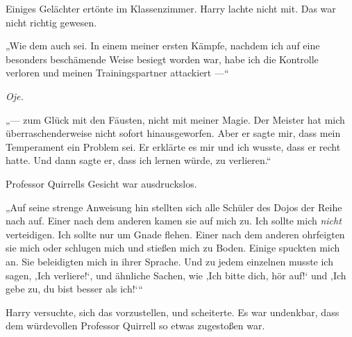 Einiges Gelächter ertönte im Klassenzimmer. Harry lachte nicht mit. Das war nicht richtig gewesen.

„Wie dem auch sei. In einem meiner ersten Kämpfe, nachdem ich auf eine besonders beschämende Weise besiegt worden war, habe ich die Kontrolle verloren und meinen Trainingspartner attackiert —“

\emph{Oje.}

„— zum Glück mit den Fäusten, nicht mit meiner Magie. Der Meister hat mich überraschenderweise nicht sofort hinausgeworfen. Aber er sagte mir, dass mein Temperament ein Problem sei. Er erklärte es mir und ich wusste, dass er recht hatte. Und dann sagte er, dass ich lernen würde, zu verlieren.“

Professor Quirrells Gesicht war ausdruckslos.

„Auf seine strenge Anweisung hin stellten sich alle Schüler des Dojos der Reihe nach auf. Einer nach dem anderen kamen sie auf mich zu. Ich sollte mich \emph{nicht} verteidigen. Ich sollte nur um Gnade flehen. Einer nach dem anderen ohrfeigten sie mich oder schlugen mich und stießen mich zu Boden. Einige spuckten mich an. Sie beleidigten mich in ihrer Sprache. Und zu jedem einzelnen musste ich sagen, ‚Ich verliere!‘, und ähnliche Sachen, wie ‚Ich bitte dich, hör auf!‘ und ‚Ich gebe zu, du bist besser als ich!‘“

Harry versuchte, sich das vorzustellen, und scheiterte. Es war undenkbar, dass dem würdevollen Professor Quirrell so etwas zugestoßen war.

